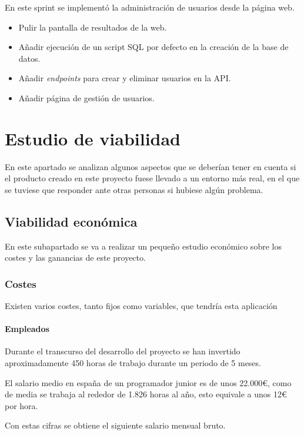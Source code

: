 En este sprint se implementó la administración de usuarios desde la página web.

\begin{itemize}
    \item Pulir la pantalla de resultados de la web.
    \item Añadir ejecución de un script SQL por defecto en la creación de la
    base de datos.
    \item Añadir \textit{endpoints} para crear y eliminar usuarios en la API.
    \item Añadir página de gestión de usuarios.
\end{itemize}

\section{Estudio de viabilidad}

En este apartado se analizan algunos aspectos que se deberían tener en cuenta si
el producto creado en este proyecto fuese llevado a un entorno más real, en el
que se tuviese que responder ante otras personas si hubiese algún problema.

\subsection{Viabilidad económica}

En este subapartado se va a realizar un pequeño estudio económico sobre los
costes y las ganancias de este proyecto.

\subsubsection{Costes}

Existen varios costes, tanto fijos como variables, que tendría esta aplicación

\paragraph{Empleados}

Durante el transcurso del desarrollo del proyecto se han invertido
aproximadamente 450 horas de trabajo durante un periodo de 5 meses.

El salario medio en españa de un programador junior es de unos 22.000€, como de
media se trabaja al rededor de 1.826 horas al año, esto equivale a unos 12€ por
hora.

Con estas cifras se obtiene el siguiente salario mensual bruto.

